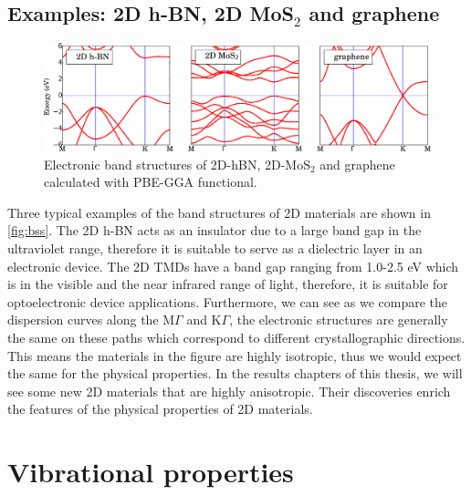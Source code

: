 \subsection{Examples: 2D h-BN, 2D MoS$_2$ and graphene}
\begin{figure}[htbp!] 
\centering  
\includegraphics[width=\textwidth]{bss.eps}
\caption{Electronic band structures of 2D-hBN, 2D-MoS$_2$ and graphene calculated with PBE-GGA functional. }  
\label{fig:bss}
\end{figure} 
Three typical examples of the band structures of 2D materials are shown in \autoref{fig:bss}. The 2D h-BN acts as an insulator due to a large band gap in the ultraviolet range, therefore it is suitable to serve as a dielectric layer in an electronic device. The 2D TMDs have a band gap ranging from 1.0-2.5 eV which is in the visible and the near infrared range of light, therefore, it is suitable for optoelectronic device applications. Furthermore, we can see as we compare the dispersion curves along the M$\Gamma$ and K$\Gamma$, the electronic structures are generally the same on these paths which correspond to different crystallographic directions. This means the materials in the figure are highly isotropic, thus we would expect the same for the physical properties. In the results chapters of this thesis, we will see some new 2D materials that are highly anisotropic. Their discoveries enrich the features of the physical properties of 2D materials.

\section{Vibrational properties}

